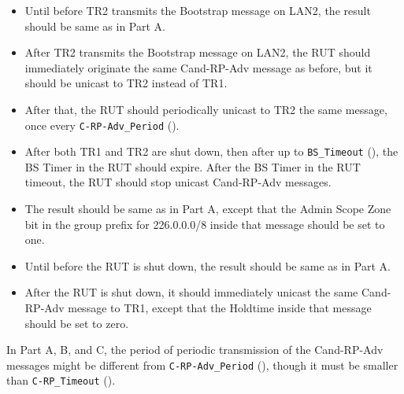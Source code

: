 \documentclass[11pt]{report}
\begin{document}
\begin{itemize}

  \item Until before TR2 transmits the Bootstrap message on LAN2, the result
  should be same as in Part A.

  \item After TR2 transmits the Bootstrap message on LAN2, the RUT should
  immediately originate the same Cand-RP-Adv message as before, but it should
  be unicast to TR2 instead of TR1.

  \item After that, the RUT should periodically unicast to TR2 the same
  message, once every \verb=C-RP-Adv_Period= ({\PimsmCRPAdvPeriod}).

  \item After both TR1 and TR2 are shut down, then after up
  to \verb=BS_Timeout= ({\PimsmBSTimeout}), the BS Timer in the RUT should
  expire. After the BS Timer in the RUT timeout, the RUT should stop
  unicast Cand-RP-Adv messages.  

\end{itemize}


\begin{itemize}

  \item The result should be same as in Part A, except that the Admin Scope
  Zone bit in the group prefix for 226.0.0.0/8 inside that message should be
  set to one.

\end{itemize}


\begin{itemize}

  \item Until before the RUT is shut down, the result should be same as in
  Part A.

  \item After the RUT is shut down, it should immediately unicast the
  same Cand-RP-Adv message to TR1, except that the Holdtime inside that
  message should be set to zero.

\end{itemize}

In Part A, B, and C, the period of periodic transmission of the Cand-RP-Adv
messages might be different from \verb=C-RP-Adv_Period=
({\PimsmCRPAdvPeriod}), though it must be smaller than
\verb=C-RP_Timeout= ({\PimsmCRPTimeout}).
\end{document}
